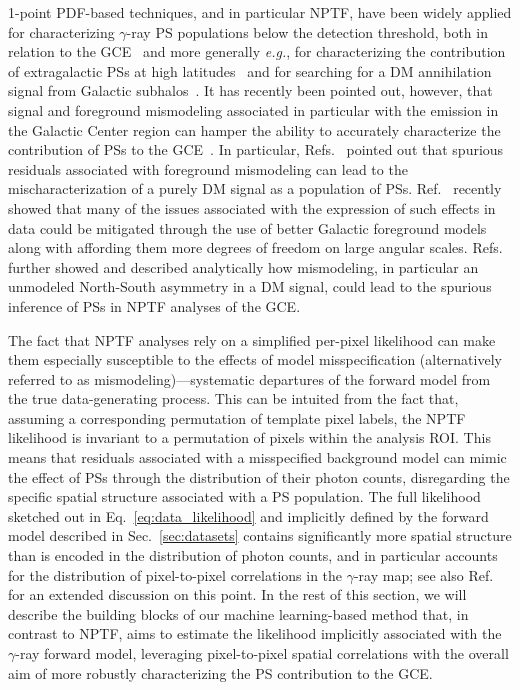 \documentclass[prd,aps,10pt,nofootinbib,twocolumn,superscriptaddress,preprintnumbers,balancelastpage,longbibliography]{revtex4-1}
\begin{document}
1-point PDF-based techniques, and in particular NPTF, have been widely applied for characterizing $\gamma$-ray PS populations below the \Fermi detection threshold, both in relation to the GCE~\cite{Lee:2015fea,Leane:2020pfc,Leane:2020nmi,Buschmann:2020adf,Calore:2021bty} and more generally \emph{e.g.}, for characterizing the contribution of extragalactic PSs at high latitudes~\cite{Lisanti:2016jub,Zechlin:2016pme,Zechlin:2015wdz} and for searching for a DM annihilation signal from Galactic subhalos~\cite{Somalwar:2020awt}. It has recently been pointed out, however, that signal and foreground mismodeling associated in particular with the emission in the Galactic Center region can hamper the ability to accurately characterize the contribution of PSs to the GCE~\cite{Leane:2019xiy,Leane:2020pfc}. In particular, Refs.~\cite{Lee:2015fea,Leane:2019xiy,Chang:2019ars} pointed out that spurious residuals associated with foreground mismodeling can lead to the mischaracterization of a purely DM signal as a population of PSs. Ref.~\cite{Buschmann:2020adf} recently showed that many of the issues associated with the expression of such effects in \Fermi data could be mitigated through the use of better Galactic foreground models along with affording them more degrees of freedom on large angular scales.
Refs.~\cite{Leane:2020pfc,Leane:2020nmi} further showed and described analytically how mismodeling, in particular an unmodeled North-South asymmetry in a DM signal, could lead to the spurious inference of PSs in NPTF analyses of the GCE. %

The fact that NPTF analyses rely on a simplified per-pixel likelihood can make them especially susceptible to the effects of model misspecification (alternatively referred to as mismodeling)---systematic departures of the forward model from the true data-generating process. This can be intuited from the fact that, assuming a corresponding permutation of template pixel labels, the NPTF likelihood is invariant to a permutation of pixels within the analysis ROI. This means that residuals associated with a misspecified background model can mimic the effect of PSs through the distribution of their photon counts, disregarding the specific spatial structure associated with a PS population. The full likelihood sketched out in Eq.~\eqref{eq:data_likelihood} and implicitly defined by the forward model described in Sec.~\ref{sec:datasets} contains significantly more spatial structure than is encoded in the distribution of photon counts, and in particular accounts for the distribution of pixel-to-pixel correlations in the $\gamma$-ray map; see also Ref.~\cite{List:2021aer} for an extended discussion on this point.
In the rest of this section, we will describe the building blocks of our machine learning-based method that, in contrast to NPTF, aims to estimate the likelihood implicitly associated with the $\gamma$-ray forward model, leveraging pixel-to-pixel spatial correlations with the overall aim of more robustly characterizing the PS contribution to the GCE.
\end{document}

